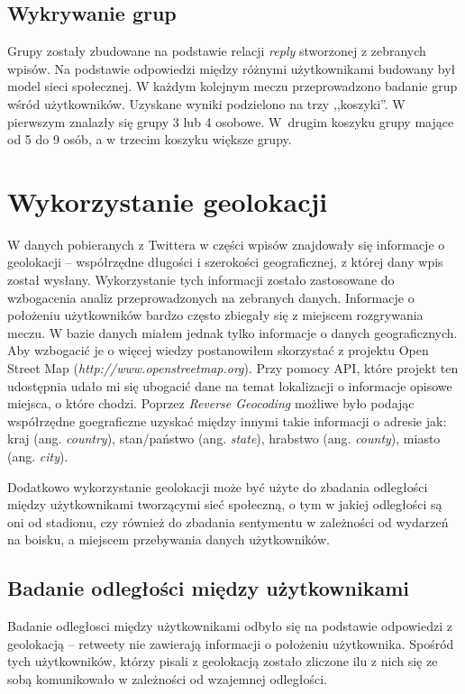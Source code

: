 \subsection{Wykrywanie grup}
\label{subsection:wykrywaniegrup}
Grupy zostały zbudowane na podstawie relacji \textit{reply}
stworzonej z zebranych wpisów. Na podstawie odpowiedzi między różnymi
użytkownikami budowany był model sieci społecznej.
W każdym kolejnym meczu przeprowadzono badanie grup wśród użytkowników.
Uzyskane wyniki podzielono na trzy ,,koszyki''. W pierwszym znalazły się grupy 
3 lub 4 osobowe. W~drugim koszyku grupy mające od 5 do 9 osób, a w trzecim koszyku
większe grupy. 


\section{Wykorzystanie geolokacji}
\label{section:wykorzystaniegeolokacji}
W danych pobieranych z Twittera w części wpisów znajdowały się informacje o 
geolokacji -- współrzędne długości i szerokości geograficznej, z której
dany wpis został wysłany. Wykorzystanie tych informacji zostało zastosowane
do wzbogacenia analiz przeprowadzonych na zebranych danych. Informacje
o położeniu użytkowników bardzo często zbiegały się z miejscem rozgrywania meczu.
W bazie danych miałem jednak tylko informacje o danych geograficznych.
Aby wzbogacić je o więcej wiedzy postanowiłem skorzystać z projektu
Open Street Map (\textit{http://www.openstreetmap.org}).
Przy pomocy API, które projekt ten udostępnia udało mi się ubogacić dane
na temat lokalizacji o informacje opisowe miejsca, o które chodzi.
Poprzez \textit{Reverse Geocoding} możliwe było podając współrzędne
goegraficzne uzyskać między innymi takie informacji o adresie jak:
kraj (ang. \textit{country}), stan/państwo (ang. \textit{state}), 
hrabstwo (ang. \textit{county}), miasto (ang. \textit{city}).

Dodatkowo wykorzystanie geolokacji może być użyte do zbadania odległości między 
użytkownikami tworzącymi sieć społeczną, o tym w jakiej odległości są oni od stadionu,
czy również do zbadania sentymentu w zależności od wydarzeń na boisku,
a miejscem przebywania danych użytkowników. 



\subsection{Badanie odległości między użytkownikami}
\label{subsection:badanieodleglosci}
Badanie odległosci między użytkownikami odbyło się na podstawie odpowiedzi z
geolokacją -- retweety nie zawierają informacji o położeniu użytkownika.
Spośród tych użytkowników, którzy pisali z geolokacją zostało zliczone ilu z
nich się ze sobą komunikowało w zależności od wzajemnej odległości.








